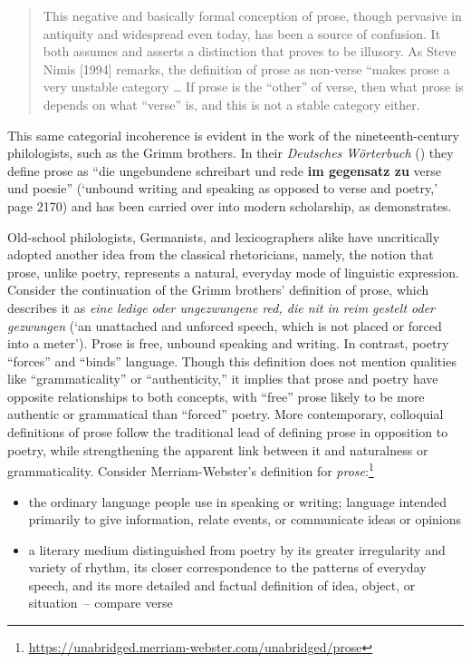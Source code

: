 \begin{quote}
This negative and basically formal conception of prose, though pervasive in antiquity and widespread even today, has been a source of confusion. It both assumes and asserts a distinction that proves to be illusory. As Steve Nimis [1994] remarks, the definition of prose as non-verse “makes prose a very unstable category … If prose is the “other” of verse, then what prose is depends on what “verse” is, and this is not a stable category either.
\end{quote}

\noindent This same categorial incoherence is evident in the work of the nineteenth\hyp century philologists, such as the Grimm brothers. In their \textit{Deutsches Wörterbuch} (\citeyear{Grimm1889}) they define prose as “die ungebundene schreibart und rede \textbf{im gegensatz zu} verse und poesie” (‘unbound writing and speaking as opposed to verse and poetry,’ page 2170) and has been carried over into modern scholarship, as \citet{Fleischer2006} demonstrates.

Old-school philologists, Germanists, and lexicographers alike have uncritically adopted another idea from the classical rhetoricians, namely, the notion that prose, unlike poetry, represents a natural, everyday mode of linguistic expression. Consider the continuation of the Grimm brothers’ definition of prose, which describes it as \textit{eine ledige oder ungezwungene red, die nit in reim gestelt oder gezwungen} (‘an unattached and unforced speech, which is not placed or forced into a meter’). Prose is free, unbound speaking and writing. In contrast, poetry “forces” and “binds” language. Though this definition does not mention qualities like “grammaticality” or “authenticity,” it implies that prose and poetry have opposite relationships to both concepts, with “free” prose likely to be more authentic or grammatical than “forced” poetry. More contemporary, colloquial definitions of prose follow the traditional lead of defining prose in opposition to poetry, while strengthening the apparent link between it and naturalness or grammaticality. Consider Merriam-Webster’s definition for \textit{prose}:\footnote{\url{https://unabridged.merriam-webster.com/unabridged/prose}\label{fn:2:10}} 

\begin{itemize}
\item  the ordinary language people use in speaking or writing; language intended primarily to give information, relate events, or communicate ideas or opinions
\item  a literary medium distinguished from poetry by its greater irregularity and variety of rhythm, its closer correspondence to the patterns of everyday speech, and its more detailed and factual definition of idea, object, or situation~--  compare verse
\end{itemize}

